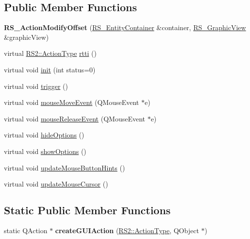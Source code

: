 \subsection*{Public Member Functions}
\begin{DoxyCompactItemize}
\item 
\hypertarget{classRS__ActionModifyOffset_a9e5209cf53fc6cda1d6f03bbafbada5e}{{\bfseries R\-S\-\_\-\-Action\-Modify\-Offset} (\hyperlink{classRS__EntityContainer}{R\-S\-\_\-\-Entity\-Container} \&container, \hyperlink{classRS__GraphicView}{R\-S\-\_\-\-Graphic\-View} \&graphic\-View)}\label{classRS__ActionModifyOffset_a9e5209cf53fc6cda1d6f03bbafbada5e}

\item 
virtual \hyperlink{classRS2_afe3523e0bc41fd637b892321cfc4b9d7}{R\-S2\-::\-Action\-Type} \hyperlink{classRS__ActionModifyOffset_a168e57e42c5a2b26e2a16eeb66a8e54d}{rtti} ()
\item 
virtual void \hyperlink{classRS__ActionModifyOffset_a159be9aa4f95caf6fc5fdab18986c9e4}{init} (int status=0)
\item 
virtual void \hyperlink{classRS__ActionModifyOffset_a7f1379d68732bb3469505bd99cd38e81}{trigger} ()
\item 
virtual void \hyperlink{classRS__ActionModifyOffset_a9fa34b4e26d3c1d5fbff53a33d7d17a0}{mouse\-Move\-Event} (Q\-Mouse\-Event $\ast$e)
\item 
virtual void \hyperlink{classRS__ActionModifyOffset_a0e815937b940b81f39e6453335568255}{mouse\-Release\-Event} (Q\-Mouse\-Event $\ast$e)
\item 
virtual void \hyperlink{classRS__ActionModifyOffset_a7d33727c1f90dff0d73a23d2c8bb7edd}{hide\-Options} ()
\item 
virtual void \hyperlink{classRS__ActionModifyOffset_a9062e2fe23ff3ca70f6f5dcd629753c8}{show\-Options} ()
\item 
virtual void \hyperlink{classRS__ActionModifyOffset_a1875bdf9d6f64e0d309e4652bedd1a42}{update\-Mouse\-Button\-Hints} ()
\item 
virtual void \hyperlink{classRS__ActionModifyOffset_afbfc4fa4b8750fab68257e755300fe87}{update\-Mouse\-Cursor} ()
\end{DoxyCompactItemize}
\subsection*{Static Public Member Functions}
\begin{DoxyCompactItemize}
\item 
\hypertarget{classRS__ActionModifyOffset_ae977174675296c0e146596ebc38177e8}{static Q\-Action $\ast$ {\bfseries create\-G\-U\-I\-Action} (\hyperlink{classRS2_afe3523e0bc41fd637b892321cfc4b9d7}{R\-S2\-::\-Action\-Type}, Q\-Object $\ast$)}\label{classRS__ActionModifyOffset_ae977174675296c0e146596ebc38177e8}

\end{DoxyCompactItemize}
